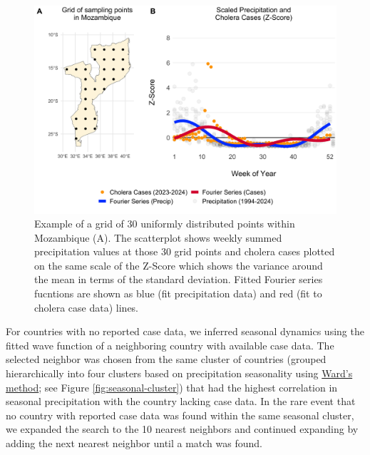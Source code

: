 \documentclass[
]{book}
\begin{document}
\begin{figure}

{\centering \includegraphics[width=1\linewidth]{figures/seasonal_transmission_example_MOZ} 

}

\caption{Example of a grid of 30 uniformly distributed points within Mozambique (A). The scatterplot shows weekly summed precipitation values at those 30 grid points and cholera cases plotted on the same scale of the Z-Score which shows the variance around the mean in terms of the standard deviation. Fitted Fourier series fucntions are shown as blue (fit precipitation data) and red (fit to cholera case data) lines.}\label{fig:seasonal-example}
\end{figure}

For countries with no reported case data, we inferred seasonal dynamics using the fitted wave function of a neighboring country with available case data. The selected neighbor was chosen from the same cluster of countries (grouped hierarchically into four clusters based on precipitation seasonality using \href{https://en.wikipedia.org/wiki/Ward\%27s_method}{Ward's method}; see Figure \ref{fig:seasonal-cluster}) that had the highest correlation in seasonal precipitation with the country lacking case data. In the rare event that no country with reported case data was found within the same seasonal cluster, we expanded the search to the 10 nearest neighbors and continued expanding by adding the next nearest neighbor until a match was found.
\end{document}
